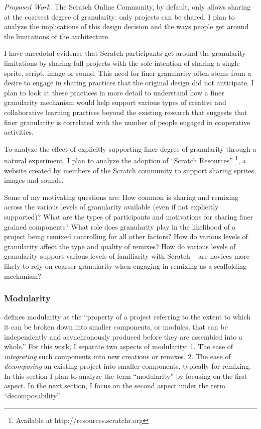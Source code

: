 \emph{Proposed Work.}
The Scratch Online Community, by default, only allows sharing at the coarsest degree of granularity: only projects can be shared. 
I plan to analyze the implications of this design decision and the ways  people get around the limitations of the architecture.

I have anecdotal evidence that Scratch participants get around the granularity limitations by sharing full projects with the sole intention of sharing a single sprite, script, image or sound.
This need for finer granularity often stems from a desire to engage in sharing practices that the original design did not anticipate. 
I plan to look at these practices in more detail to understand how a finer granularity mechanism would help support various types of creative and collaborative learning practices beyond the existing research that suggests that finer granularity is correlated with the number of people engaged in cooperative activities.

To analyze the effect of explicitly supporting finer degree of granularity through a natural experiment, I plan to analyze the adoption of ``Scratch Resources'' \footnote{Available at http://resources.scratchr.org}, a website created by members of the Scratch community to support sharing sprites, images and sounds. 

Some of my motivating questions are: 
How common is sharing and remixing across the various levels of granularity available (even if not explicitly supported)?
What are the types of participants and motivations for sharing finer grained components?
What role does granularity play in the likelihood of a project being remixed controlling for all other factors?
How do various levels of granularity affect the type and quality of remixes?
How do various levels of granularity support various levels of familiarity with Scratch -- are novices more likely to rely on coarser granularity when engaging in remixing as a scaffolding mechanism?

\subsubsection{Modularity}
\citet{benkler_coases_2002} defines modularity as the ``property of a project referring to the extent to which it can be broken down into smaller components, or modules, that can be independently and asynchronously produced before they are assembled into a whole.''
For this work, I separate two aspects of modularity:
1. The ease of \emph{integrating} such components into new creations or remixes.
2. The ease of \emph{decomposing} an existing project into smaller components, typically for remixing.
In this section I plan to analyze the term ``modularity'' by focusing on the first aspect.
In the next section, I focus on the second aspect under the term ``decomposability''.

